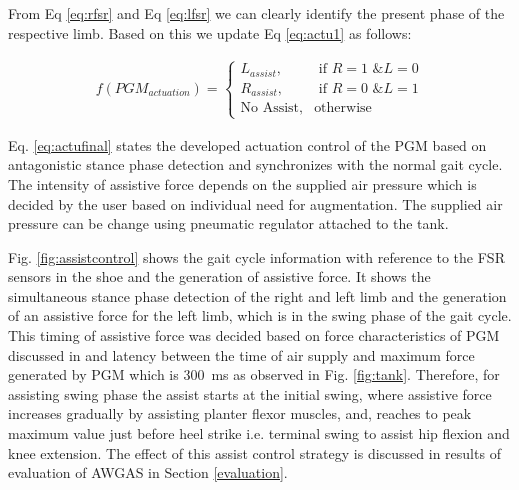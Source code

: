 \documentclass[paper,JRM,paper]{jaciiiarticle}
\begin{document}
From Eq \ref{eq:rfsr} and Eq \ref{eq:lfsr} we can clearly identify the present phase of the respective limb. Based on this we update Eq \ref{eq:actu1} as follows:

\begin{align}\label{eq:actufinal}
f(PGM_{actuation}) = ^{}
\begin{cases}
L_{assist},& \text{ if } R = 1\text{ \& } L = 0\\ 
R_{assist},& \text{ if } R = 0\text{ \& } L = 1\\ 
\text{No Assist}, & \text{otherwise}
\end{cases}
\end{align}

Eq. \ref{eq:actufinal} states the developed actuation control of the PGM based on antagonistic stance phase detection and synchronizes with the normal gait cycle. The intensity of assistive force depends on the supplied air pressure which is decided by the user based on individual need for augmentation. The supplied air pressure can be change using pneumatic regulator attached to the tank. 

Fig. \ref{fig:assistcontrol} shows the gait cycle information with reference to the FSR sensors in the shoe and the generation of assistive force. It shows the simultaneous stance phase detection of the right and left limb and the generation of an assistive force for the left limb, which is in the swing phase of the gait cycle. 
This timing of assistive force was decided based on  force characteristics of PGM discussed in \cite{13} and latency between the time of air supply and maximum force generated by PGM which is \SI{300}{\milli\second} as observed in Fig. \ref{fig:tank}. Therefore, for assisting swing phase the assist starts at the initial swing, where assistive force increases gradually by assisting planter flexor muscles, and, reaches to peak maximum value just before heel strike i.e. terminal swing to assist hip flexion and knee extension. The effect of this assist control strategy is discussed in results of evaluation of AWGAS in Section \ref{evaluation}.
\end{document}
